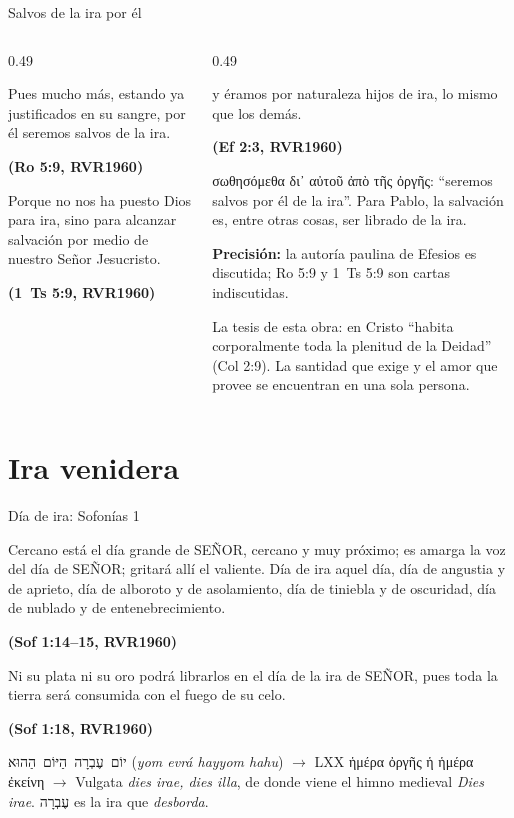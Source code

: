 \documentclass[hyperref={bookmarks=false},aspectratio=169]{beamer}
\newcommand{\heb}[1]{\mbox{\foreignlanguage{hebrew}{#1}}}
\newcommand{\grc}[1]{\foreignlanguage{ancientgreek}{#1}}
\newcommand{\SENOR}{S{\fontsize{0.78em}{1em}\selectfont EÑOR}}
\newcommand{\fuente}[1]{\par\hfill{\upshape\bfseries\footnotesize\textcolor{azul}{#1}}}
\newcommand{\precision}[1]{{\footnotesize\color{gris}\textbf{Precisión:} #1}}
\begin{document}
\begin{frame}{Salvos de la ira por él}
\begin{columns}[t,onlytextwidth]
\begin{column}{0.49\textwidth}
\begin{cita}Pues mucho más, estando ya justificados en su sangre, por él seremos salvos de la ira.\fuente{(Ro 5:9, RVR1960)}\end{cita}
\begin{cita}Porque no nos ha puesto Dios para ira, sino para alcanzar salvación por medio de nuestro Señor Jesucristo.\fuente{(1~Ts 5:9, RVR1960)}\end{cita}
\end{column}
\begin{column}{0.49\textwidth}
\begin{cita}y éramos por naturaleza hijos de ira, lo mismo que los demás.\fuente{(Ef 2:3, RVR1960)}\end{cita}
\scriptsize\grc{σωθησόμεθα δι᾽ αὐτοῦ ἀπὸ τῆς ὀργῆς}: ``seremos salvos por él de la ira''. Para Pablo, la salvación es, entre otras cosas, ser librado de la ira.\par\smallskip
\precision{la autoría paulina de Efesios es discutida; Ro 5:9 y 1~Ts 5:9 son cartas indiscutidas.}\par\smallskip
\small La tesis de esta obra: en Cristo ``habita corporalmente toda la plenitud de la Deidad'' (Col 2:9). La santidad que exige y el amor que provee se encuentran en una sola persona.
\end{column}
\end{columns}
\end{frame}

\section{Ira venidera}

\begin{frame}{Día de ira: Sofonías 1}
\begin{cita}Cercano está el día grande de \SENOR, cercano y muy próximo; es amarga la voz del día de \SENOR; gritará allí el valiente. Día de ira aquel día, día de angustia y de aprieto, día de alboroto y de asolamiento, día de tiniebla y de oscuridad, día de nublado y de entenebrecimiento.\fuente{(Sof 1:14--15, RVR1960)}\end{cita}
\begin{cita}Ni su plata ni su oro podrá librarlos en el día de la ira de \SENOR, pues toda la tierra será consumida con el fuego de su celo.\fuente{(Sof 1:18, RVR1960)}\end{cita}
\scriptsize\heb{יוֹם עֶבְרָה הַיּוֹם הַהוּא} (\emph{yom evrá hayyom hahu}) $\rightarrow$ LXX \grc{ἡμέρα ὀργῆς ἡ ἡμέρα ἐκείνη} $\rightarrow$ Vulgata \emph{dies irae, dies illa}, de donde viene el himno medieval \emph{Dies irae}. \heb{עֶבְרָה} es la ira que \emph{desborda}.
\end{frame}
\end{document}
